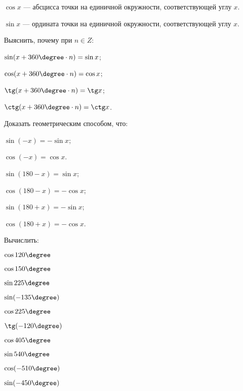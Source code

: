 \begin{class}[number=2]
\begin{listofex}
{\begin{minipage}[t]{0,92\textwidth}
				\textbf{\boldmath\( {\cos x} \)} --- абсцисса точки на единичной окружности, соответствующей углу \( x \).
				
				\textbf{\boldmath\( \sin x \)} --- ордината точки на единичной окружности, соответствующей углу \( x \).
			\end{minipage}
		}
		\item {}
		\item Выяснить, почему при \( n\in Z \):
		\begin{enumcols}[itemcolumns=2]
			\item \( \sin(x+360\degree\cdot n) = \sin x \);
			\item \( \cos(x+360\degree\cdot n) = \cos x \);
			\item \( \tg(x+360\degree\cdot n) = \tg x \);
			\item \( \ctg(x+360\degree\cdot n) = \ctg x \).
		\end{enumcols}
		\item Доказать геометрическим способом, что:
		\begin{enumcols}[itemcolumns=3]
			\item \( \sin(-x) = -\sin x \);
			\item \( \cos(-x) = \cos x \).
			\item \( \sin(180 - x) = \sin x \);
			\item \( \cos(180 - x) = -\cos x \);
			\item \( \sin(180+x) = -\sin x \);
			\item \( \cos(180+x) = -\cos x \).
		\end{enumcols}
		\item Вычислить:
		\begin{enumcols}[itemcolumns=5]
			\item \( \cos120\degree \)
			\item \( \cos150\degree \)
			\item \( \sin225\degree \)
			\item \( \sin(-135\degree )\)
			\item \( \cos225\degree \)
			\item \( \tg(-120\degree) \)
			\item \( \cos405\degree \)
			\item \( \sin540\degree \)
			\item \( \cos(-510\degree) \)
			\item \( \sin(-450\degree) \)
		\end{enumcols}
	\end{listofex}
\end{class}
